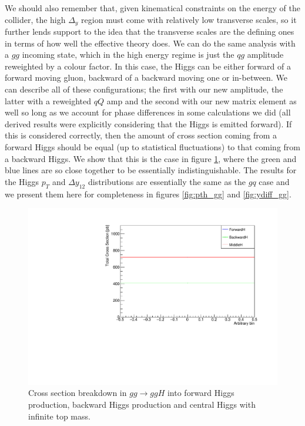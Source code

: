 We should also remember that, given kinematical constraints on the energy of the collider, the high $\Delta_y$ region must come with relatively low transverse scales, so it further lends support to the idea that the transverse scales are the defining ones in terms of how well the effective theory does. We can do the same analysis with a $gg$ incoming state, which in the high energy regime is just the $qg$ amplitude reweighted by a colour factor. In this case, the Higgs can be either forward of a forward moving gluon, backward of a backward moving one or in-between. We can describe all of these configurations; the first with our new amplitude, the latter with a reweighted $qQ$ amp and the second with our new matrix element as well so long as we account for phase differences in some calculations we did (all derived results were explicitly considering that the Higgs is emitted forward). If this is considered correctly, then the amount of cross section coming from a forward Higgs should be equal (up to statistical fluctuations) to that coming from a backward Higgs. We show that this is the case in figure \ref{fig:gg_crosssection}, where the green and blue lines are so close together to be essentially indistinguishable. The results for the Higgs $p_T$ and $\Delta y_{12}$ distributions are essentially the same as the $gq$ case and we present them here for completeness in figures \ref{fig:pth_gg} and \ref{fig:ydiff_gg}. 

\begin{figure}[t]
\centering
\includegraphics[scale=0.75]{Images/xsec_breakdown_ggh.pdf}
\caption{Cross section breakdown in $gg \to ggH$ into forward Higgs production, backward Higgs production and central Higgs with infinite top mass.}
\label{fig:gg_crosssection}
\end{figure}

